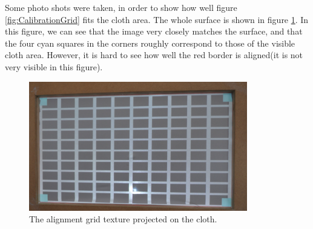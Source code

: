 \documentclass[]{article}
\begin{document}
Some photo shots were taken, in order to show how well figure \ref{fig:CalibrationGrid} fits the cloth area. The whole surface is shown in figure \ref{fig:ProjectedCalibrationGrid}. In this figure, we can see that the image very closely matches the surface, and that the four cyan squares in the corners roughly correspond to those of the visible cloth area. However, it is hard to see how well the red border is aligned(it is not very visible in this figure). 

\begin{figure}[hbtp]
    \centering
    \includegraphics[width=0.85\textwidth]{figures/ProjectedCalibrationGridC2.jpg}
    \caption{The alignment grid texture projected on the cloth.}
    \label{fig:ProjectedCalibrationGrid}
\end{figure}
\end{document}
